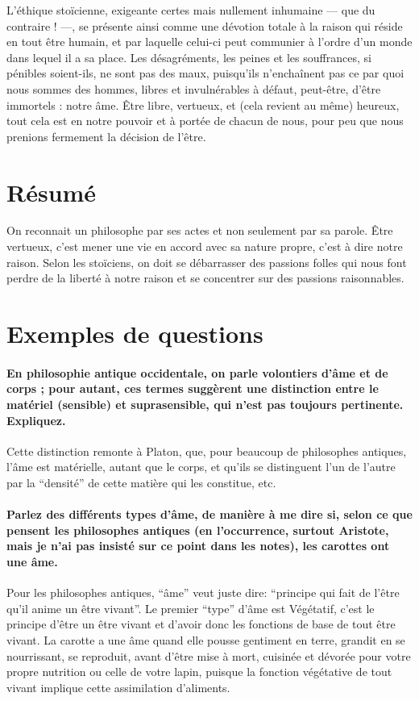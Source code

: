 \documentclass[11pt,a4paper]{article} %
\begin{document}
L'éthique stoïcienne, exigeante certes mais nullement inhumaine --- que du contraire ! ---, se
présente ainsi comme une dévotion totale à la raison qui réside en tout être humain, et par
laquelle celui-ci peut communier à l'ordre d'un monde dans lequel il a sa place. Les désagréments, les peines et les souffrances, si pénibles soient-ils, ne sont pas des maux,
puisqu'ils n'enchaînent pas ce par quoi nous sommes des hommes, libres et invulnérables
à défaut, peut-être, d'être immortels : notre âme. Être libre, vertueux, et (cela revient au
même) heureux, tout cela est en notre pouvoir et à portée de chacun de nous, pour peu que
nous prenions fermement la décision de l'être.

\section{Résumé}
On reconnait un philosophe par ses actes et non seulement par sa parole.
Être vertueux, c'est mener une vie en accord avec sa nature propre, c'est à dire notre raison.
Selon les stoïciens, on doit se débarrasser des passions folles qui nous font perdre de la liberté à notre raison
et se concentrer sur des passions raisonnables.

\section{Exemples de questions}
\paragraph{En philosophie antique occidentale, on parle volontiers d'âme et de corps ; pour autant, ces termes suggèrent une distinction entre le matériel (sensible) et suprasensible, qui n'est pas toujours pertinente. Expliquez.}
Cette distinction remonte à Platon, que, pour beaucoup de philosophes antiques, l'âme est matérielle, autant que le corps, et qu'ils se distinguent l'un de l'autre par la ``densité'' de cette matière qui les constitue, etc.

\paragraph{Parlez des différents types d'âme, de manière à me dire si, selon ce que pensent les philosophes antiques (en l'occurrence, surtout Aristote, mais je n'ai pas insisté sur ce point dans les notes), les carottes ont une âme.}
Pour les philosophes antiques, ``âme'' veut juste dire: ``principe qui fait de l'être qu'il anime un être vivant''.
Le premier ``type'' d'âme est Végétatif, c'est le principe d'être un être vivant et d'avoir donc les fonctions de base de tout être vivant.
La carotte a une âme quand elle pousse gentiment en terre, grandit en se nourrissant, se reproduit,
avant d'être mise à mort,
cuisinée et dévorée pour votre propre nutrition ou celle de votre lapin,
puisque la fonction végétative de tout vivant implique cette assimilation d'aliments.
\end{document}
